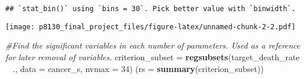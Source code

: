 \documentclass[]{article}
\newenvironment{Shaded}{\begin{snugshade}}{\end{snugshade}}
\newcommand{\KeywordTok}[1]{\textcolor[rgb]{0.13,0.29,0.53}{\textbf{#1}}}
\newcommand{\DataTypeTok}[1]{\textcolor[rgb]{0.13,0.29,0.53}{#1}}
\newcommand{\DecValTok}[1]{\textcolor[rgb]{0.00,0.00,0.81}{#1}}
\newcommand{\StringTok}[1]{\textcolor[rgb]{0.31,0.60,0.02}{#1}}
\newcommand{\CommentTok}[1]{\textcolor[rgb]{0.56,0.35,0.01}{\textit{#1}}}
\newcommand{\OperatorTok}[1]{\textcolor[rgb]{0.81,0.36,0.00}{\textbf{#1}}}
\newcommand{\NormalTok}[1]{#1}
\begin{document}
\begin{Shaded}
\end{Shaded}

\begin{verbatim}
## `stat_bin()` using `bins = 30`. Pick better value with `binwidth`.
\end{verbatim}

\texttt{[image: p8130\_final\_project\_files/figure-latex/unnamed-chunk-2-2.pdf]}

\begin{Shaded}
\begin{Highlighting}[]
\CommentTok{#Find the significant variables in each number of parameters. Used as a reference for later removal of variables. }
\NormalTok{criterion_subset =}\StringTok{ }\KeywordTok{regsubsets}\NormalTok{(target_death_rate }\OperatorTok{~}\StringTok{ }\NormalTok{., }\DataTypeTok{data =}\NormalTok{ cancer_s, }\DataTypeTok{nvmax =} \DecValTok{34}\NormalTok{)}
\NormalTok{   (}\DataTypeTok{rs =} \KeywordTok{summary}\NormalTok{(criterion_subset))}
\end{Highlighting}
\end{Shaded}
\end{document}
